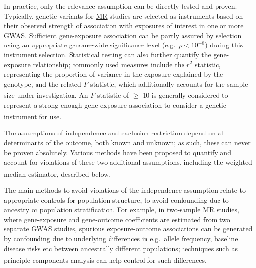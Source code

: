 \documentclass[
]{article}
\begin{document}
In practice, only the relevance assumption can be directly tested and proven. Typically, genetic variants for \hyperref[acronyms_MR]{MR} studies are selected as instruments based on their observed strength of association with exposures of interest in one or more \hyperref[acronyms_GWAS]{GWAS}. Sufficient gene-exposure association can be partly assured by selection using an appropriate genome-wide significance level (e.g.~\(p < 10 ^{-8}\)) during this instrument selection. Statistical testing can also further quantify the gene-exposure relationship; commonly used measures include the \(r^2\) statistic, representing the proportion of variance in the exposure explained by the genotype, and the related \(F\)-statistic, which additionally accounts for the sample size under investigation\textsuperscript{}. An \(F\)-statistic of \(\ge\) 10 is generally considered to represent a strong enough gene-exposure association to consider a genetic instrument for use\textsuperscript{}.

The assumptions of independence and exclusion restriction depend on all determinants of the outcome, both known and unknown; as such, these can never be proven absolutely. Various methods have been proposed to quantify and account for violations of these two additional assumptions, including the weighted median estimator, described below\textsuperscript{}.

The main methods to avoid violations of the independence assumption relate to appropriate controls for population structure, to avoid confounding due to ancestry or population stratification. For example, in two-sample MR studies, where gene-exposure and gene-outcome coefficients are estimated from two separate \hyperref[acronyms_GWAS]{GWAS} studies, spurious exposure-outcome associations can be generated by confounding due to underlying differences in e.g.~allele frequency, baseline disease risks etc between ancestrally different populations; techniques such as principle components analysis can help control for such differences\textsuperscript{}.
\end{document}
